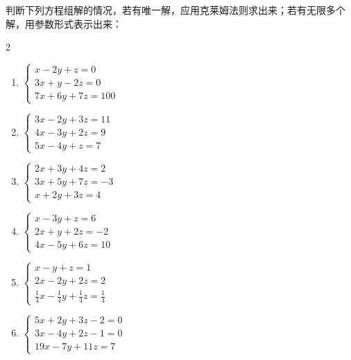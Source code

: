\begin{ex}
    判断下列方程组解的情况，若有唯一解，应用克莱姆法则求出来；若有无限多个解，用参数形式表示出来：
    \begin{multicols}{2}
\begin{enumerate}
    \item $\begin{cases}
         x-2 y+ z=0\\ 
        3 x+ y-2 z=0 \\ 
        7x+6 y+7z=100
    \end{cases}$
    \item $\begin{cases}
        3 x-2 y+3 z=11 \\ 
        4 x-3 y+2 z=9 \\ 
        5 x-4 y+z=7
    \end{cases}$
\item $\begin{cases} 2 x+3 y+4 z =2 \\ 3 x+5 y+7 z =-3 \\ x+2 y+3 z =4 \end{cases}$
\item $\begin{cases}x-3 y+z=6 \\ 2 x+y+2 z=-2 \\ 4 x-5 y+6 z=10\end{cases}$
\item $\begin{cases}x-y+z=1 \\ 2 x-2 y+2 z=2 \\ \frac{1}{4} x-\frac{1}{4} y+\frac{1}{4}z=\frac{1}{4}\end{cases}$
\item $\begin{cases}5 x+2 y+3 z-2=0 \\ 3 x-4 y+2 z-1=0 \\ 19 x-7 y+11 z=7\end{cases}$
\end{enumerate}        
    \end{multicols}
\end{ex}

